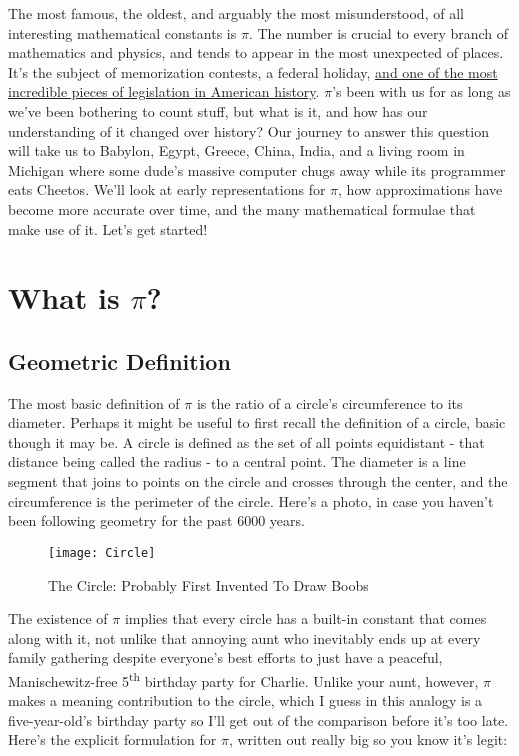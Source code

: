 \documentclass[11pt,titlepage]{article}
\begin{document}
The most famous, the oldest, and arguably the most misunderstood, of all interesting mathematical constants is $\pi$. The number is crucial to every branch of mathematics and physics, and tends to appear in the most unexpected of places. It's the subject of memorization contests, a federal holiday, \href{http://www.straightdope.com/columns/read/805/did-a-state-legislature-once-pass-a-law-saying-pi-equals-3}{and one of the most incredible pieces of legislation in American history}. $\pi$'s been with us for as long as we've been bothering to count stuff, but what is it, and how has our understanding of it changed over history? Our journey to answer this question will take us to Babylon, Egypt, Greece, China, India, and a living room in Michigan where some dude's massive computer chugs away while its programmer eats Cheetos\textsuperscript{\textregistered}. We'll look at early representations for $\pi$, how approximations have become more accurate over time, and the many mathematical formulae that make use of it. Let's get started!

\section*{What is $\pi$?}
\subsection*{Geometric Definition}


The most basic definition of $\pi$ is the ratio of a circle's circumference to its diameter. Perhaps it might be useful to first recall the definition of a circle, basic though it may be. A circle is defined as the set of all points equidistant - that distance being called the radius - to a central point. The diameter is a line segment that joins to points on the circle and crosses through the center, and the circumference is the perimeter of the circle. Here's a photo, in case you haven't been following geometry for the past 6000 years.\\
\begin{figure}[h]
\centering
\texttt{[image: Circle]}
\caption{The Circle: Probably First Invented To Draw Boobs}
\end{figure}

The existence of $\pi$ implies that every circle has a built-in constant that comes along with it, not unlike that annoying aunt who inevitably ends up at every family gathering despite everyone's best efforts to just have a peaceful, Manischewitz-free 5\textsuperscript{th} birthday party for Charlie. Unlike your aunt, however, $\pi$ makes a meaning contribution to the circle, which I guess in this analogy is a five-year-old's birthday party so I'll get out of the comparison before it's too late. Here's the explicit formulation for $\pi$, written out really big so you know it's legit:
\end{document}
